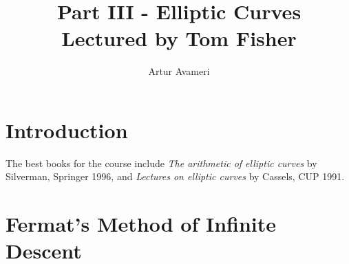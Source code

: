 \documentclass{article}
\title{Part III - Elliptic Curves
    \\ \large
    Lectured by Tom Fisher 
}
\author{Artur Avameri}
\date{}
\theoremstyle{definition}
\begin{document}
\maketitle
\tableofcontents
\newpage
 
\section{Introduction}



The best books for the course include \textit{The arithmetic of elliptic curves} by Silverman, Springer 1996, and \textit{Lectures on elliptic curves} by Cassels, CUP 1991. 

\section{Fermat's Method of Infinite Descent}
\end{document}
